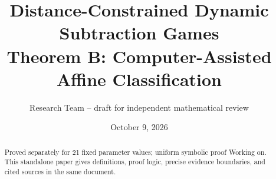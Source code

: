 \documentclass[11pt]{article}
\title{\textbf{Distance-Constrained Dynamic Subtraction Games}\\[0.4em]Theorem B: Computer-Assisted Affine Classification}
\author{Research Team -- draft for independent mathematical review}
\date{October 9, 2026}
\begin{document}
\maketitle
\begin{abstract}Proved separately for 21 fixed parameter values; uniform symbolic proof Working on. This standalone paper gives definitions, proof logic, precise evidence boundaries, and cited sources in the same document.\end{abstract}
\tableofcontents



\end{document}
